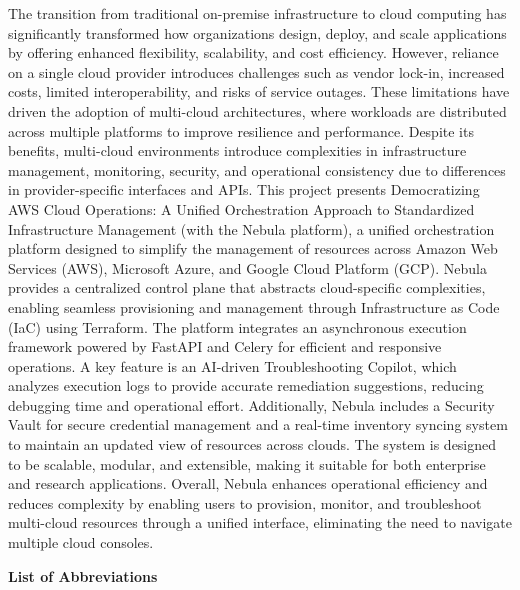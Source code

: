 The transition from traditional on-premise infrastructure to cloud computing has significantly transformed how organizations design, deploy, and scale applications by offering enhanced flexibility, scalability, and cost efficiency. However, reliance on a single cloud provider introduces challenges such as vendor lock-in, increased costs, limited interoperability, and risks of service outages. These limitations have driven the adoption of multi-cloud architectures, where workloads are distributed across multiple platforms to improve resilience and performance. Despite its benefits, multi-cloud environments introduce complexities in infrastructure management, monitoring, security, and operational consistency due to differences in provider-specific interfaces and APIs. This project presents Democratizing AWS Cloud Operations: A Unified Orchestration Approach to Standardized Infrastructure Management (with the Nebula platform), a unified orchestration platform designed to simplify the management of resources across Amazon Web Services (AWS), Microsoft Azure, and Google Cloud Platform (GCP). Nebula provides a centralized control plane that abstracts cloud-specific complexities, enabling seamless provisioning and management through Infrastructure as Code (IaC) using Terraform. The platform integrates an asynchronous execution framework powered by FastAPI and Celery for efficient and responsive operations. A key feature is an AI-driven Troubleshooting Copilot, which analyzes execution logs to provide accurate remediation suggestions, reducing debugging time and operational effort. Additionally, Nebula includes a Security Vault for secure credential management and a real-time inventory syncing system to maintain an updated view of resources across clouds. The system is designed to be scalable, modular, and extensible, making it suitable for both enterprise and research applications. Overall, Nebula enhances operational efficiency and reduces complexity by enabling users to provision, monitor, and troubleshoot multi-cloud resources through a unified interface, eliminating the need to navigate multiple cloud consoles.



\newpage
\begin{center}
    {\Huge \textbf{List of Abbreviations}}
\end{center}
\vspace{1.5cm}

